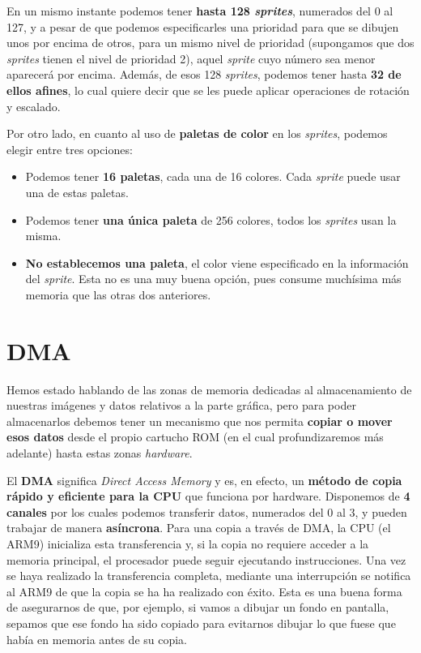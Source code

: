 En un mismo instante podemos tener \textbf{hasta 128 \textit{sprites}}, numerados del 0 al 127, y a pesar de que podemos especificarles una prioridad para que se dibujen unos por encima de otros, para un mismo nivel de prioridad (supongamos que dos \textit{sprites} tienen el nivel de prioridad 2), aquel \textit{sprite} cuyo número sea menor aparecerá por encima. Además, de esos 128 \textit{sprites}, podemos tener hasta \textbf{32 de ellos afines}, lo cual quiere decir que se les puede aplicar operaciones de rotación y escalado.

\vspace{0.5cm}

Por otro lado, en cuanto al uso de \textbf{paletas de color} en los \textit{sprites}, podemos elegir entre tres opciones:

\vspace{0.5cm}

\begin{itemize}
 \item Podemos tener \textbf{16 paletas}, cada una de 16 colores. Cada \textit{sprite} puede usar una de estas paletas.
 \item Podemos tener \textbf{una única paleta} de 256 colores, todos los \textit{sprites} usan la misma.
 \item \textbf{No establecemos una paleta}, el color viene especificado en la información del \textit{sprite}. Esta no es una muy buena opción, pues consume muchísima más memoria que las otras dos anteriores.
\end{itemize}

\vspace{1cm}

\section{DMA}

Hemos estado hablando de las zonas de memoria dedicadas al almacenamiento de nuestras imágenes y datos relativos a la parte gráfica, pero para poder almacenarlos debemos tener un mecanismo que nos permita \textbf{copiar o mover esos datos} desde el propio cartucho ROM (en el cual profundizaremos más adelante) hasta estas zonas \textit{hardware}.

\vspace{0.5cm}

El \textbf{DMA} significa \textit{Direct Access Memory} y es, en efecto, un \textbf{método de copia rápido y eficiente para la CPU} que funciona por hardware. Disponemos de \textbf{4 canales} por los cuales podemos transferir datos, numerados del 0 al 3, y pueden trabajar de manera \textbf{asíncrona}. Para una copia a través de DMA, la CPU (el ARM9) inicializa esta transferencia y, si la copia no requiere acceder a la memoria principal, el procesador puede seguir ejecutando instrucciones. Una vez se haya realizado la transferencia completa, mediante una interrupción se notifica al ARM9 de que la copia se ha ha realizado con éxito. Esta es una buena forma de asegurarnos de que, por ejemplo, si vamos a dibujar un fondo en pantalla, sepamos que ese fondo ha sido copiado para evitarnos dibujar lo que fuese que había en memoria antes de su copia.

